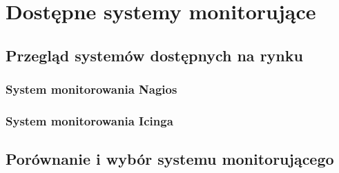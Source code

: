 \chapter{Dostępne systemy monitorujące}

\section[Przegląd systemów][Przegląd systemów dostępnych na rynku]{Przegląd systemów dostępnych na rynku}

\subsection[Nagios][System monitorowania Nagios]{System monitorowania Nagios}

\subsection[Icinga][System monitorowania Icinga]{System monitorowania Icinga}
\label{subsec:Icinga}

\section[Wybór systemu][Porównanie i wybór systemu monitorującego]{Porównanie i wybór systemu monitorującego}
